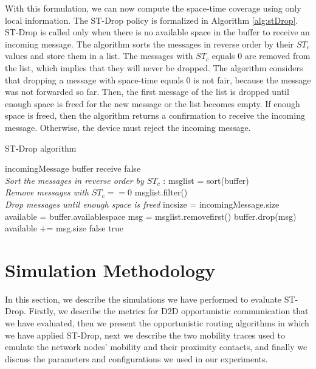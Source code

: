 With this formulation, we can now compute the space-time coverage using only local information. The ST-Drop policy is formalized in Algorithm \ref{alg:stDrop}.
ST-Drop is called only when there is no available space in the buffer to receive an incoming message. The algorithm sorts the messages in reverse order by their $ST_c$
values and store them in a list. The messages with $ST_c$ equals 0 are removed from the list, which implies that they will never be dropped. The algorithm considers that
dropping a message with space-time equals 0 is not fair, because the message was not forwarded so far. Then, the first message of the list is dropped until enough space is
freed for the new message or the list becomes empty. If enough space is freed, then the algorithm returns a confirmation to receive the incoming message. Otherwise,
the device must reject the incoming message.

\begin{algorithm}

 \caption{ST-Drop algorithm}
 \label{alg:stDrop}
 \begin{algorithmic}[1]
 \renewcommand{\algorithmicrequire}{\textbf{Input:}}
 \renewcommand{\algorithmicensure}{\textbf{Output:}}
 \REQUIRE incomingMessage
 \REQUIRE buffer
 \ENSURE  receive
    \RETURN false
  \ENDIF
 \\ \textit{Sort the messages in reverse order by $ST_c$} :
  \STATE msglist = sort(buffer)
 \\ \textit{Remove messages with $ST_c == 0$}
  \STATE msglist.filter()
 \\ \textit{Drop messages until enough space is freed}
  \STATE incsize = incomingMessage.size
  \STATE available = buffer.availablespace
    \STATE msg = msglist.removefirst()
    \STATE buffer.drop(msg)
    \STATE available += msg.size
  \ENDWHILE
  \RETURN false
  \ELSE
  \RETURN true
  \ENDIF
 \end{algorithmic}
 \end{algorithm}

\section{Simulation Methodology}
\label{sec:experiments}

In this section, we describe the simulations we have performed to evaluate ST-Drop. Firstly, we describe the metrics for D2D opportunistic communication that we have evaluated,
then we present the opportunistic routing algorithms in which we have applied ST-Drop, next we describe the two mobility traces used to emulate the network nodes' mobility and
their proximity contacts, and finally we discuss the parameters and configurations we used in our experiments.

